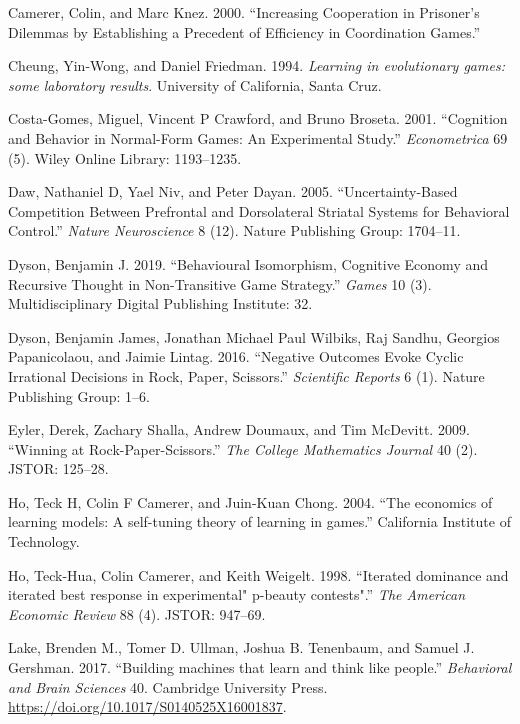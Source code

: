 \documentclass[smallextended]{svjour3}       %
\begin{document}
\leavevmode\hypertarget{ref-knez2000}{}%
Camerer, Colin, and Marc Knez. 2000. ``Increasing Cooperation in
Prisoner's Dilemmas by Establishing a Precedent of Efficiency in
Coordination Games.''

\leavevmode\hypertarget{ref-cheung1994learning}{}%
Cheung, Yin-Wong, and Daniel Friedman. 1994. \emph{Learning in
evolutionary games: some laboratory results}. University of California,
Santa Cruz.

\leavevmode\hypertarget{ref-costa2001cognition}{}%
Costa-Gomes, Miguel, Vincent P Crawford, and Bruno Broseta. 2001.
``Cognition and Behavior in Normal-Form Games: An Experimental Study.''
\emph{Econometrica} 69 (5). Wiley Online Library: 1193--1235.

\leavevmode\hypertarget{ref-daw2005uncertainty}{}%
Daw, Nathaniel D, Yael Niv, and Peter Dayan. 2005. ``Uncertainty-Based
Competition Between Prefrontal and Dorsolateral Striatal Systems for
Behavioral Control.'' \emph{Nature Neuroscience} 8 (12). Nature
Publishing Group: 1704--11.

\leavevmode\hypertarget{ref-dyson2019behavioural}{}%
Dyson, Benjamin J. 2019. ``Behavioural Isomorphism, Cognitive Economy
and Recursive Thought in Non-Transitive Game Strategy.'' \emph{Games} 10
(3). Multidisciplinary Digital Publishing Institute: 32.

\leavevmode\hypertarget{ref-dyson2016negative}{}%
Dyson, Benjamin James, Jonathan Michael Paul Wilbiks, Raj Sandhu,
Georgios Papanicolaou, and Jaimie Lintag. 2016. ``Negative Outcomes
Evoke Cyclic Irrational Decisions in Rock, Paper, Scissors.''
\emph{Scientific Reports} 6 (1). Nature Publishing Group: 1--6.

\leavevmode\hypertarget{ref-eyler2009winning}{}%
Eyler, Derek, Zachary Shalla, Andrew Doumaux, and Tim McDevitt. 2009.
``Winning at Rock-Paper-Scissors.'' \emph{The College Mathematics
Journal} 40 (2). JSTOR: 125--28.

\leavevmode\hypertarget{ref-ho2004economics}{}%
Ho, Teck H, Colin F Camerer, and Juin-Kuan Chong. 2004. ``The economics
of learning models: A self-tuning theory of learning in games.''
California Institute of Technology.

\leavevmode\hypertarget{ref-ho1998iterated}{}%
Ho, Teck-Hua, Colin Camerer, and Keith Weigelt. 1998. ``Iterated
dominance and iterated best response in experimental" p-beauty
contests".'' \emph{The American Economic Review} 88 (4). JSTOR: 947--69.

\leavevmode\hypertarget{ref-Lake2017}{}%
Lake, Brenden M., Tomer D. Ullman, Joshua B. Tenenbaum, and Samuel J.
Gershman. 2017. ``Building machines that learn and think like people.''
\emph{Behavioral and Brain Sciences} 40. Cambridge University Press.
\url{https://doi.org/10.1017/S0140525X16001837}.
\end{document}
